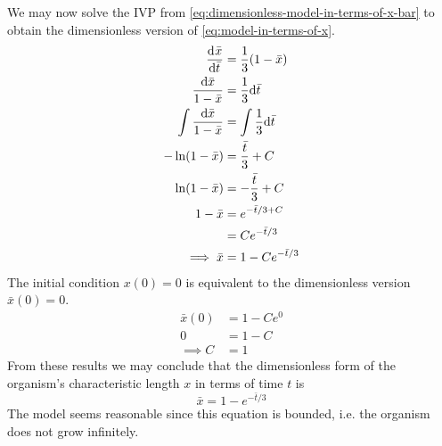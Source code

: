 \documentclass[12pt,twoside]{article}
\begin{document}
We may now solve the IVP from \cref{eq:dimensionless-model-in-terms-of-x-bar} to
obtain the dimensionless version of \cref{eq:model-in-terms-of-x}.
\begin{equation*}
  \begin{aligned}
    \frac{\mathrm{d}^{} {\bar{x}}}{\mathrm{d}{\bar{t}}^{}} &= \frac{1}{3}(1-\bar{x}) \\
    \frac{\mathrm{d}{\bar{x}}}{1-\bar{x}} &= \frac{1}{3} \mathrm{d}{\bar{t}} \\
    \int \frac{\mathrm{d}{\bar{x}}}{1-\bar{x}} &= \int \frac{1}{3} \mathrm{d}{\bar{t}} \\
    -\ln (1-\bar{x}) &= \frac{\bar{t}}{3} + C \\
    \ln (1-\bar{x}) &= -\frac{\bar{t}}{3} + C \\
    1-\bar{x} &= e^{-\bar{t}/3+C} \\
    &= Ce^{-\bar{t}/3} \\
    \implies \bar{x} &= 1-Ce^{-\bar{t}/3}
  \end{aligned}
\end{equation*}
The initial condition $x(0)=0$ is equivalent to the dimensionless version
$\bar{x}(0)=0$.
\begin{equation*}
  \begin{aligned}
    \bar{x}(0) &= 1-Ce^{0} \\
    0 &= 1-C \\
    \implies C &= 1
  \end{aligned}
\end{equation*}
From these results we may conclude that the dimensionless form of the organism's
characteristic length $x$ in terms of time $t$ is
\begin{equation*} \boxed{
    \bar{x} = 1-e^{-\bar{t}/3}
  }
\end{equation*}
The model seems reasonable since this equation is bounded, i.e. the organism
does not grow infinitely.


\end{document}
